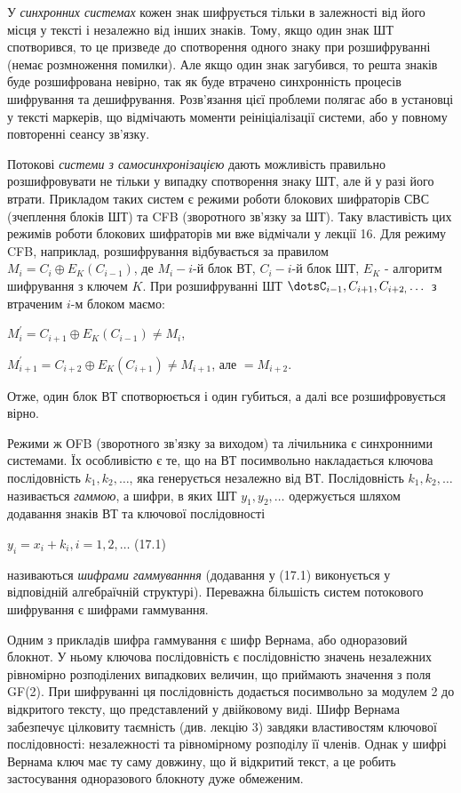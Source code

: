 У \textit{синхронних системах}\textbf{ }кожен знак шифрується тільки в
залежності від його місця у тексті і незалежно від інших знаків. Тому, якщо
один знак ШТ спотворився, то це призведе до спотворення одного знаку при
розшифруванні (немає розмноження помилки). Але якщо один знак загубився, то
решта знаків буде розшифрована невірно, так як буде втрачено синхронність
процесів шифрування та дешифрування. Розв’язання цієї проблеми полягає або в
установці у тексті маркерів, що відмічають моменти реініціалізації системи, або
у повному повторенні сеансу зв’язку.

Потокові \textit{системи з самосинхронізацією} дають можливість правильно
розшифровувати не тільки у випадку спотворення знаку ШТ, але й у разі його
втрати. Прикладом таких систем є режими роботи блокових шифраторів СВС 
(зчеплення блоків ШТ)  та CFB (зворотного зв’язку за ШТ). Таку властивість цих
режимів роботи блокових шифраторів ми вже відмічали у лекції 16. Для режиму
CFB, наприклад, розшифрування відбувається за правилом  
$M_{i}=C_{i}{\oplus}E_{K}(C_{i-1})$, де  $M_i-i${}-й блок ВТ, 
$C_{i}-i${}-й блок ШТ,  $E_K$ \nobreakdash- алгоритм шифрування з
ключем  $K$. При розшифруванні ШТ 
$\dotsC_{i-1},C_{i+1},C_{i+2,}\dots$
 з втраченим   $i${}-м блоком маємо:

{\centering
 $M_{i}^{'}=C_{i+1}{\oplus}E_{K}(C_{i-1})\neq M_i$,
\par}

{\centering
 $M_{i+1}^{'}=C_{i+2}{\oplus}E_K(C_{i+1})\neq M_{i+1}$, але 
$=M_{i+2}$.
\par}

Отже, один блок ВТ спотворюється і один губиться, а далі все розшифровується
вірно.

Режими ж ОFB (зворотного зв’язку за виходом) та  лічильника є синхронними
системами. Їх особливістю є те, що на ВТ посимвольно накладається ключова
послідовність  $k_{1},k_2,\dots$, яка генерується
незалежно від ВТ. Послідовність  $k_{1},k_2,\dots$
називається \textit{гаммою}, а шифри, в яких ШТ 
$y_{1},y_2,\dots$ одержується шляхом додавання
знаків ВТ та ключової послідовності 

{\raggedleft
 $y_{i}=x_{i}+k_i,i=1,2,\dots$  (17.1)
\par}

називаються \textit{шифрами гаммуванння}\textbf{ }(додавання у\textbf{ }(17.1)
виконується у відповідній алгебраїчній структурі). Переважна більшість систем
потокового шифрування є шифрами гаммування.

Одним з прикладів шифра гаммування  є шифр Вернама, або одноразовий блокнот. У
ньому ключова послідовність є послідовністю значень незалежних рівномірно
розподілених випадкових величин, що приймають значення з поля GF(2). При
шифруванні ця послідовність додається посимвольно за модулем 2  до відкритого
тексту, що представлений у двійковому виді. Шифр Вернама забезпечує цілковиту
таємність (див. лекцію 3) завдяки властивостям ключової послідовності:
незалежності та рівномірному розподілу її членів. Однак у шифрі Вернама ключ
має ту саму довжину, що й відкритий текст, а це робить застосування
одноразового блокноту дуже обмеженим.

